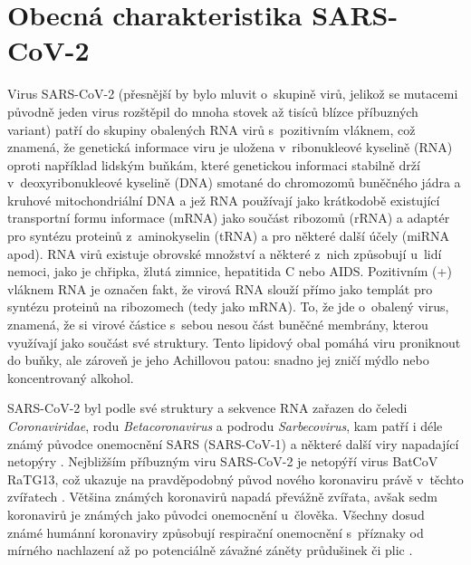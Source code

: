 \section*{Obecná charakteristika SARS-CoV-2}

Virus SARS-CoV-2 (přesnější by bylo mluvit o~skupině virů, jelikož se mutacemi původně jeden virus rozštěpil do mnoha stovek až tisíců blízce příbuzných variant) patří do skupiny obalených RNA virů s~pozitivním vláknem, což znamená, že genetická informace viru je uložena v~ribonukleové kyselině (RNA) oproti například lidským buňkám, které genetickou informaci stabilně drží v~deoxyribonukleové kyselině (DNA) smotané do chromozomů buněčného jádra a kruhové mitochondriální DNA a jež RNA používají jako krátkodobě existující transportní formu informace (mRNA) jako součást ribozomů (rRNA) a adaptér pro syntézu proteinů z~aminokyselin (tRNA) a pro některé další účely (miRNA apod). RNA virů existuje obrovské množství a některé z~nich způsobují u~lidí nemoci, jako je chřipka, žlutá zimnice, hepatitida C nebo AIDS. Pozitivním (+) vláknem RNA je označen fakt, že virová RNA slouží přímo jako templát pro syntézu proteinů na ribozomech (tedy jako mRNA). To, že jde o~obalený virus, znamená, že si virové částice s~sebou nesou část buněčné membrány, kterou využívají jako součást své struktury. Tento lipidový obal pomáhá viru proniknout do buňky, ale zároveň je jeho Achillovou patou: snadno jej zničí mýdlo nebo koncentrovaný alkohol.

SARS-CoV-2 byl podle své struktury a sekvence RNA zařazen do čeledi \textit{Coronaviridae}, rodu \textit{Betacoronavirus} a podrodu \textit{Sarbecovirus}, kam patří i déle známý původce onemocnění SARS (SARS-CoV-1) a některé další viry napadající netopýry \cite{Zhou:2020,Lu:2020a}. Nejbližším příbuzným viru SARS-CoV-2 je netopýří virus BatCoV RaTG13, což ukazuje na pravděpodobný původ nového koronaviru právě v~těchto zvířatech \cite{Chan:2020,Hu:2021}. Většina známých koronavirů napadá převážně zvířata, avšak sedm koronavirů je známých jako původci onemocnění u~člověka. Všechny dosud známé humánní koronaviry způsobují respirační onemocnění s~příznaky od mírného nachlazení až po potenciálně závažné záněty průdušinek či plic \cite{Wevers:2009}.

